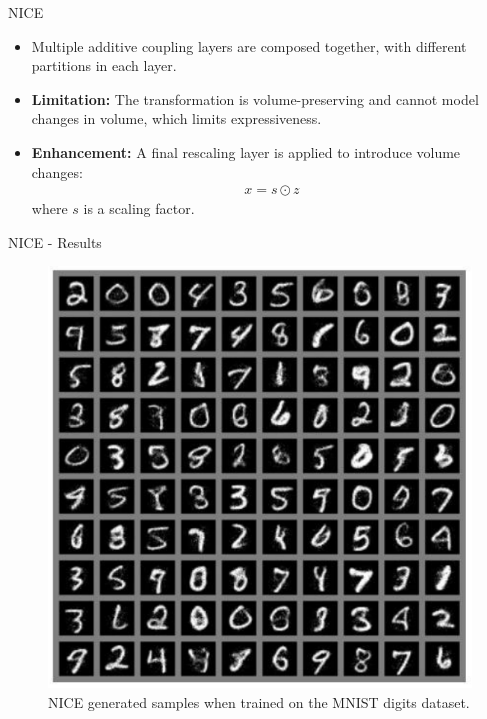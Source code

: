 \begin{frame}[allowframebreaks]{NICE}
\begin{itemize}
\begin{itemize}
    \end{itemize}
    \framebreak
    \item Multiple additive coupling layers are composed together, with different partitions in each layer.
    \item \textbf{Limitation:} The transformation is volume-preserving and cannot model changes in volume, which limits expressiveness.
    \item \textbf{Enhancement:} A final rescaling layer is applied to introduce volume changes:
    \begin{align*}
        x = s \odot z
    \end{align*}
    where $s$ is a scaling factor.
\end{itemize}
\end{frame}

\begin{frame}[allowframebreaks]{NICE - Results}
\begin{figure}
    \centering
    \includegraphics[height=0.8\textheight, width=\textwidth, keepaspectratio]{images/norm-flow/nfm_nice_mnist.png}
    \caption*{NICE generated samples when trained on the MNIST digits dataset.}
\end{figure}

\framebreak


\end{frame}
